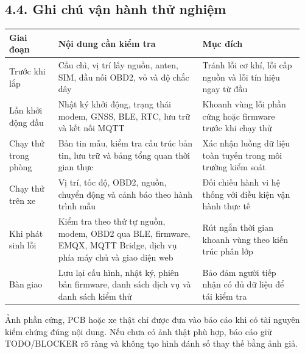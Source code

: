 \documentclass[a4paper]{extarticle}
\newcounter{none} %
\begin{document}
\subsection{4.4. Ghi chú vận hành thử nghiệm}\label{app4-trial-operation-notes-cap-nhat}

{\def\LTcaptype{none} %
\begin{longtable}{|L{0.160\linewidth}|L{0.470\linewidth}|L{0.330\linewidth}|}
\hline
\textbf{Giai đoạn} & \textbf{Nội dung cần kiểm tra} & \textbf{Mục đích} \\
\hline
\endhead
\endfoot
\endlastfoot
Trước khi lắp & Cầu chì, vị trí lấy nguồn, anten, SIM, đầu nối OBD2, vỏ và độ chắc dây & Tránh lỗi cơ khí, lỗi cấp nguồn và lỗi tín hiệu ngay từ đầu \\\hline
Lần khởi động đầu & Nhật ký khởi động, trạng thái modem, GNSS, BLE, RTC, lưu trữ và kết nối MQTT & Khoanh vùng lỗi phần cứng hoặc firmware trước khi chạy thử \\\hline
Chạy thử trong phòng & Bản tin mẫu, kiểm tra cấu trúc bản tin, lưu trữ và bảng tổng quan thời gian thực & Xác nhận luồng dữ liệu toàn tuyến trong môi trường kiểm soát \\\hline
Chạy thử trên xe & Vị trí, tốc độ, OBD2, nguồn, chuyển động và cảnh báo theo hành trình mẫu & Đối chiếu hành vi hệ thống với điều kiện vận hành thực tế \\\hline
Khi phát sinh lỗi & Kiểm tra theo thứ tự nguồn, modem, OBD2 qua BLE, firmware, EMQX, MQTT Bridge, dịch vụ phía máy chủ và giao diện web & Rút ngắn thời gian khoanh vùng theo kiến trúc phân lớp \\\hline
Bàn giao & Lưu lại cấu hình, nhật ký, phiên bản firmware, danh sách dịch vụ và danh sách kiểm thử & Bảo đảm người tiếp nhận có đủ dữ liệu để tái kiểm tra \\\hline
\end{longtable}
}

Ảnh phần cứng, PCB hoặc xe thật chỉ được đưa vào báo cáo khi có tài nguyên kiểm chứng
đúng nội dung. Nếu chưa có ảnh thật phù hợp, báo cáo giữ TODO/BLOCKER rõ ràng và
không tạo hình đánh số thay thế bằng ảnh giả.
\end{document}
